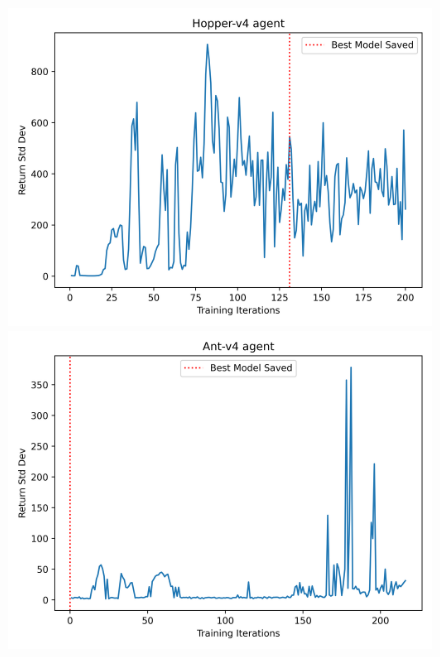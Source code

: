 \begin{figure}[H]
\begin{minipage}{0.42\textwidth}
    \centering
    \includegraphics[width=\linewidth]{plots/Hopper-v4_std_return.png}
\end{minipage}%
\hfill
\begin{minipage}{0.42\textwidth}
    \centering
    \includegraphics[width=\linewidth]{plots/Ant-v4_std_return.png}
\end{minipage}

\vspace{0.25ex}


\end{figure}
